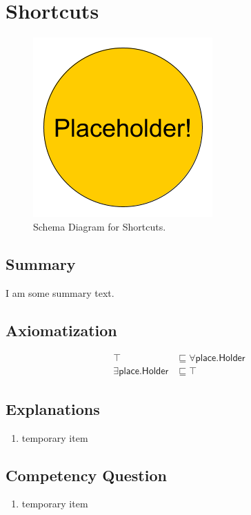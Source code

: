 \section{Shortcuts}
\label{sec:Shortcuts}
\begin{figure}[h!]
\begin{center}
\includegraphics[width=.4\textwidth]{figures/placeholder}
\end{center}
\caption{Schema Diagram for Shortcuts.}
\label{fig:Shortcuts}
\end{figure}
\subsection{Summary}
\label{sum:Shortcuts}
I am some summary text.

\subsection{Axiomatization}
\label{axs:Shortcuts}
\begin{align}
\top &\sqsubseteq \forall\textsf{place.Holder} \\ 
\exists\textsf{place.Holder} &\sqsubseteq \top 
\end{align}

\subsection{Explanations}
\label{exp:Shortcuts}
\begin{enumerate}
\item temporary item
\end{enumerate}

\subsection{Competency Question}
\label{cqs:Shortcuts}
\begin{enumerate}[CQ1.]
\item temporary item
\end{enumerate}

\newpage
